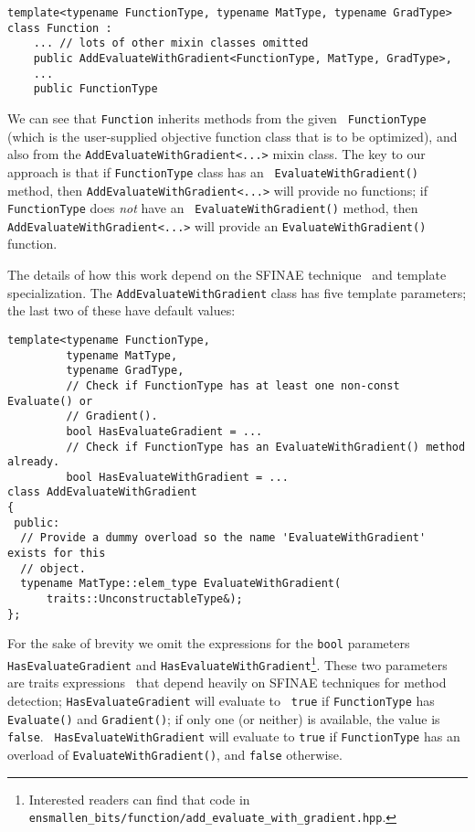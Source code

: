 \begin{verbatim}
template<typename FunctionType, typename MatType, typename GradType>
class Function :
    ... // lots of other mixin classes omitted
    public AddEvaluateWithGradient<FunctionType, MatType, GradType>,
    ...
    public FunctionType
\end{verbatim}

We can see that {\tt Function} inherits methods from the given {\tt
FunctionType} (which is the user-supplied objective function class that is to be
optimized), and also from the {\tt AddEvaluateWithGradient<...>} mixin class.
The key to our approach is that if {\tt FunctionType} class has an {\tt
EvaluateWithGradient()} method, then {\tt AddEvaluateWithGradient<...>} will
provide no functions; if {\tt FunctionType} does {\em not} have an {\tt
EvaluateWithGradient()} method, then {\tt AddEvaluateWithGradient<...>} will
provide an {\tt EvaluateWithGradient()} function.

The details of how this work depend on the SFINAE technique~\cite{TODO} and
template specialization.  The {\tt AddEvaluateWithGradient} class has five
template parameters; the last two of these have default values:

\begin{verbatim}
template<typename FunctionType,
         typename MatType,
         typename GradType,
         // Check if FunctionType has at least one non-const Evaluate() or
         // Gradient().
         bool HasEvaluateGradient = ...
         // Check if FunctionType has an EvaluateWithGradient() method already.
         bool HasEvaluateWithGradient = ...
class AddEvaluateWithGradient
{
 public:
  // Provide a dummy overload so the name 'EvaluateWithGradient' exists for this
  // object.
  typename MatType::elem_type EvaluateWithGradient(
      traits::UnconstructableType&);
};
\end{verbatim}

For the sake of brevity we omit the expressions for the {\tt bool} parameters
{\tt HasEvaluateGradient} and {\tt HasEvaluateWithGradient}\footnote{Interested
readers can find that code in {\tt
ensmallen\_bits/function/add\_evaluate\_with\_gradient.hpp}.}.  These two
parameters are traits expressions~\cite{TODO} that depend heavily on SFINAE
techniques for method detection; {\tt HasEvaluateGradient} will evaluate to {\tt
true} if {\tt FunctionType} has {\tt Evaluate()} and {\tt Gradient()}; if only
one (or neither) is available, the value is {\tt false}.  {\tt
HasEvaluateWithGradient} will evaluate to {\tt true} if {\tt FunctionType} has
an overload of {\tt EvaluateWithGradient()}, and {\tt false} otherwise.

